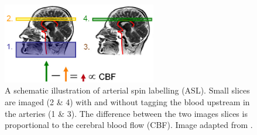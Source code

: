 \begin{figure}[!ht]
	\centering
	\includegraphics[width=0.6\textwidth, clip=true]{./Chapters/01_Introduction/Images/Asl}
	\caption{A schematic illustration of arterial spin labelling (ASL). Small slices are imaged (2 \& 4) with and without tagging the blood upstream in the arteries (1 \& 3). The difference between the two images slices is proportional to the cerebral blood flow (CBF). Image adapted from \cite{UMICH2018}.}
	\label{fig:asl}
\end{figure}